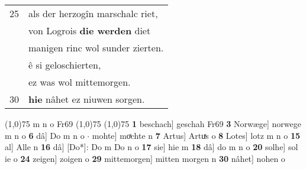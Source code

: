 \documentclass[8pt,a4paper,notitlepage]{article}
\begin{document}
\begin{table}[ht]
\begin{minipage}[t]{0.5\linewidth}
\begin{tabular}{rl}
25 & als der herzogîn marschalc riet,\\ 
 & von Logrois \textbf{die werden} diet\\ 
 & manigen rinc wol sunder zierten.\\ 
 & ê si geloschierten,\\ 
 & ez was wol mittemorgen.\\ 
30 & \textbf{hie} nâhet ez niuwen sorgen.\\ 
\end{tabular}
\scriptsize
\line(1,0){75} \newline
m n o Fr69 \newline
\line(1,0){75} \newline
\newline
\line(1,0){75} \newline
\textbf{1} beschach] geschah Fr69 \textbf{3} Norwæge] norwege m n o \textbf{6} dâ] Do m n o  $\cdot$ mohte] moͯchte n \textbf{7} Artus] Artuͯs o \textbf{8} Lotes] lotz m n o \textbf{15} al] Alle n \textbf{16} dâ] [Do*]: Do m Do n o \textbf{17} sie] hie m \textbf{18} dâ] do m n o \textbf{20} solhe] sol ie o \textbf{24} zeigen] zoigen o \textbf{29} mittemorgen] mitten morgen n \textbf{30} nâhet] nohen o \newline
\end{minipage}
\end{table}
\newpage
\end{document}
